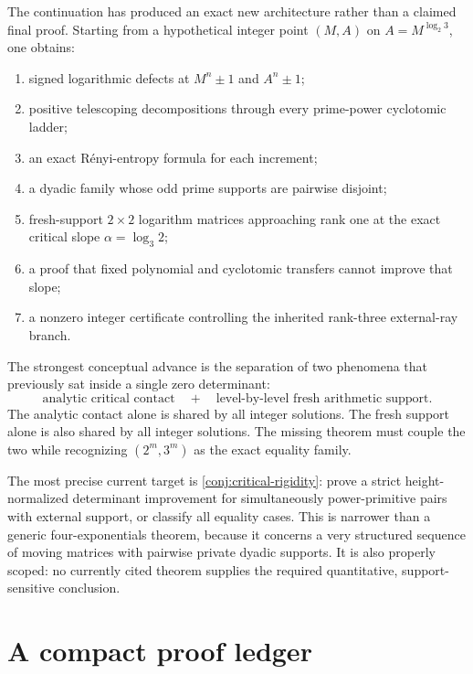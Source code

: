 \documentclass[11pt]{article}
\theoremstyle{definition}
\begin{document}
The continuation has produced an exact new architecture rather than a claimed final proof.
Starting from a hypothetical integer point $(M,A)$ on $A=M^{\log_2 3}$, one obtains:

\begin{enumerate}
\item signed logarithmic defects at $M^n\pm1$ and $A^n\pm1$;
\item positive telescoping decompositions through every prime-power cyclotomic ladder;
\item an exact R\'enyi-entropy formula for each increment;
\item a dyadic family whose odd prime supports are pairwise disjoint;
\item fresh-support $2\times2$ logarithm matrices approaching rank one at the exact
critical slope $\alpha=\log_3 2$;
\item a proof that fixed polynomial and cyclotomic transfers cannot improve that slope;
\item a nonzero integer certificate controlling the inherited rank-three external-ray
branch.
\end{enumerate}

The strongest conceptual advance is the separation of two phenomena that previously sat
inside a single zero determinant:
\begin{equation}\label{eq:final-separation}
 \text{analytic critical contact}
 \quad+\quad
 \text{level-by-level fresh arithmetic support}.
\end{equation}
The analytic contact alone is shared by all integer solutions.  The fresh support alone is
also shared by all integer solutions.  The missing theorem must couple the two while
recognizing $(2^m,3^m)$ as the exact equality family.

\begin{aeopenbox}
The most precise current target is \cref{conj:critical-rigidity}: prove a strict
height-normalized determinant improvement for simultaneously power-primitive pairs with external support, or
classify all equality cases.  This is narrower than a generic four-exponentials theorem,
because it concerns a very structured sequence of moving matrices with pairwise private
dyadic supports.  It is also properly scoped: no currently cited theorem supplies the required
quantitative, support-sensitive conclusion.
\end{aeopenbox}

\appendix

\section{A compact proof ledger}\label{app:ledger}
\end{document}
